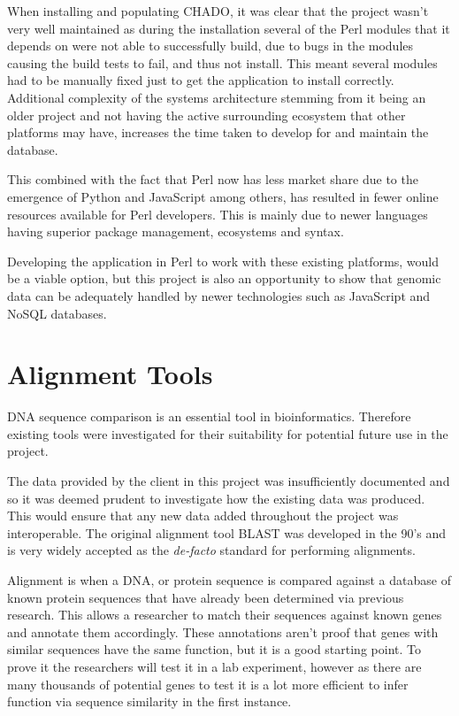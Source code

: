 When installing and populating CHADO, it was clear that the project wasn't very well maintained as during the installation several of the Perl modules that it depends on were not able to successfully build, due to bugs in the modules causing the build tests to fail, and thus not install. This meant several modules had to be manually fixed just to get the application to install correctly. Additional complexity of the systems architecture stemming from it being an older project and not having the active surrounding ecosystem that other platforms may have, increases the time taken to develop for and maintain the database.

This combined with the fact that Perl now has less market share due to the emergence of Python\cite{python} and JavaScript\cite{node} among others, has resulted in fewer online resources available for Perl developers. This is mainly due to newer languages having superior package management, ecosystems and syntax. 

Developing the application in Perl to work with these existing platforms, would be a viable option, but this project is also an opportunity to show that genomic data can be adequately handled by newer technologies such as JavaScript and NoSQL databases.

\section{Alignment Tools}
DNA sequence comparison is an essential tool in bioinformatics. Therefore existing tools were investigated for their suitability for potential future use in the project.

The data provided by the client in this project was insufficiently documented and so it was deemed prudent to investigate how the existing data was produced. This would ensure that any new data added throughout the project was interoperable.
The original alignment tool BLAST\cite{blast} was developed in the 90's and is very widely accepted as the {\it de-facto} standard for performing alignments. 

Alignment is when a DNA, or protein sequence is compared against a database of known protein sequences that have already been determined via previous research. This allows a researcher to match their sequences against known genes and annotate them accordingly. These annotations aren't proof that genes with similar sequences have the same function, but it is a good starting point. To prove it the researchers will test it in a lab experiment, however as there are many thousands of potential genes to test it is a lot more efficient to infer function via sequence similarity in the first instance.


